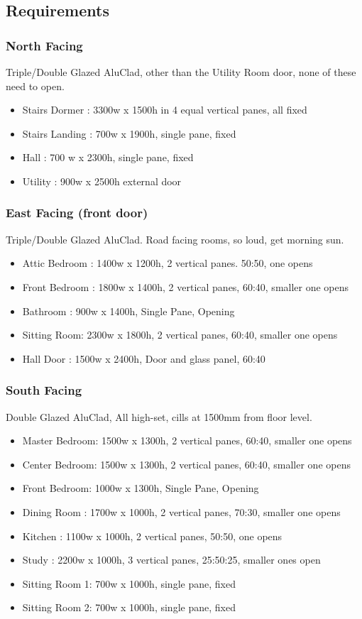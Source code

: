 \subsection{Requirements}
\subsubsection{North Facing}
Triple/Double Glazed AluClad, other than the Utility Room door, none of these need to open.
\begin{itemize}
\item Stairs Dormer : 3300w x 1500h in 4 equal vertical panes, all fixed
\item Stairs Landing : 700w x 1900h, single pane, fixed
\item Hall : 700 w x 2300h, single pane, fixed
\item Utility : 900w x 2500h external door
\end{itemize}    
    
\subsubsection{East Facing (front door)}
Triple/Double Glazed AluClad. Road facing rooms, so loud, get morning sun.
\begin{itemize}
\item Attic Bedroom : 1400w x 1200h, 2 vertical panes. 50:50, one opens
\item Front Bedroom : 1800w x 1400h, 2 vertical panes, 60:40, smaller one opens
\item Bathroom : 900w x 1400h, Single Pane, Opening
\item Sitting Room: 2300w x 1800h, 2 vertical panes, 60:40, smaller one opens
\item Hall Door : 1500w x 2400h, Door and glass panel, 60:40
    
\end{itemize}

\subsubsection{South Facing}
Double Glazed AluClad, All high-set, cills at 1500mm from floor level.
\begin{itemize}
\item Master Bedroom: 1500w x 1300h, 2 vertical panes, 60:40, smaller one opens
\item Center Bedroom: 1500w x 1300h, 2 vertical panes, 60:40, smaller one opens
\item Front Bedroom: 1000w x 1300h, Single Pane, Opening
\item Dining Room : 1700w x 1000h, 2 vertical panes, 70:30, smaller one opens
\item Kitchen : 1100w x 1000h, 2 vertical panes, 50:50, one opens
\item Study :   2200w x 1000h, 3 vertical panes, 25:50:25, smaller ones open
\item Sitting Room 1: 700w x 1000h, single pane, fixed
\item Sitting Room 2: 700w x 1000h, single pane, fixed
\end{itemize}

